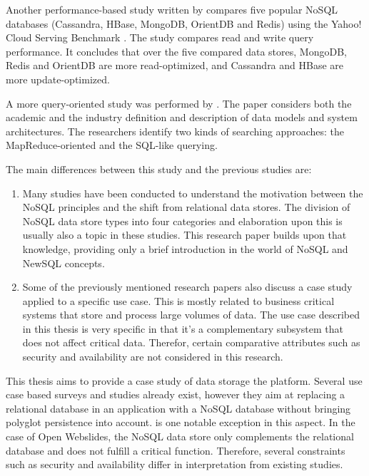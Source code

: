 Another performance-based study written by \textcite{Abramova2014} compares five popular NoSQL databases (Cassandra, HBase, MongoDB, OrientDB and Redis) using the Yahoo! Cloud Serving Benchmark \autocite{Yahoo2010}. The study compares read and write query performance. It concludes that over the five compared data stores, MongoDB, Redis and OrientDB are more read-optimized, and Cassandra and HBase are more update-optimized.

A more query-oriented study was performed by \textcite{Zhou2013}. The paper considers both the academic and the industry definition and description of data models and system architectures. The researchers identify two kinds of searching approaches: the MapReduce-oriented and the SQL-like querying.


The main differences between this study and the previous studies are:

\begin{enumerate}
  \item Many studies have been conducted to understand the motivation between the NoSQL principles and the shift from relational data stores. The division of NoSQL data store types into four categories and elaboration upon this is usually also a topic in these studies. This research paper builds upon that knowledge, providing only a brief introduction in the world of NoSQL and NewSQL concepts.
  \item Some of the previously mentioned research papers also discuss a case study applied to a specific use case. This is mostly related to business critical systems that store and process large volumes of data. The use case described in this thesis is very specific in that it's a complementary subsystem that does not affect critical data. Therefor, certain comparative attributes such as security and availability are not considered in this research.
\end{enumerate}


This thesis aims to provide a case study of data storage the \textcite{OpenWebslides2017} platform. Several use case based surveys and studies already exist, however they aim at replacing a relational database in an application with a NoSQL database without bringing polyglot persistence into account. \textcite{Sadalage2012} is one notable exception in this aspect. In the case of Open Webslides, the NoSQL data store only complements the relational database and does not fulfill a critical function. Therefore, several constraints such as security and availability differ in interpretation from existing studies.
